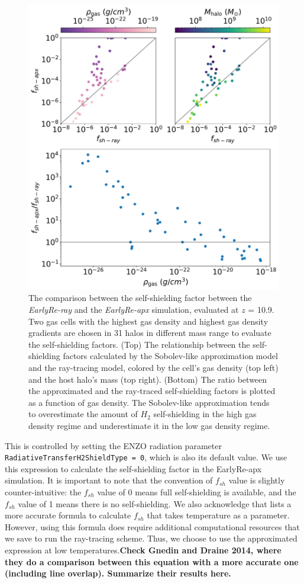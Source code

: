 \documentclass[linenumbers, twocolumn]{aastex631}
\begin{document}
\begin{figure}
	\centering
	\includegraphics[width=0.95\columnwidth]{EarlyRe/fsh_comparison_ver2.png}
	\caption{The comparison between the self-shielding factor between the \textit{EarlyRe-ray} and the \textit{EarlyRe-apx} simulation, evaluated at $z$ = 10.9. Two gas cells with the highest gas density and highest gas density gradients are chosen in 31 halos in different mass range to evaluate the self-shielding factors. (Top) The relationship between the self-shielding factors calculated by the Sobolev-like approximation model and the ray-tracing model, colored by the cell's gas density (top left) and the host halo's mass (top right). (Bottom) The ratio between the approximated and the ray-traced self-shielding factors is plotted as a function of gas density. The Sobolev-like approximation tends to overestimate the amount of $H_{2}$ self-shielding in the high gas density regime and underestimate it in the low gas density regime.}
	\label{fig:fsh_comparison}
\end{figure} 

This is controlled by setting the ENZO radiation parameter \texttt{RadiativeTransferH2ShieldType = 0}, which is also its default value. We use this expression to calculate the self-shielding factor in the EarlyRe-apx simulation. It is important to note that the convention of $f_{sh}$ value is slightly counter-intuitive: the $f_{sh}$ value of 0 means full self-shielding is available, and the $f_{sh}$ value of 1 means there is no self-shielding. We also acknowledge that \cite{Draine+1996} lists a more accurate formula to calculate $f_{sh}$ that takes temperature as a parameter. However, using this formula does require additional computational resources that we save to run the ray-tracing scheme. Thus, we choose to use the approximated expression at low temperatures.\textbf{Check Gnedin and Draine 2014, where they do a comparison between this equation with a more accurate one (including line overlap). Summarize their results here.}
\end{document}

